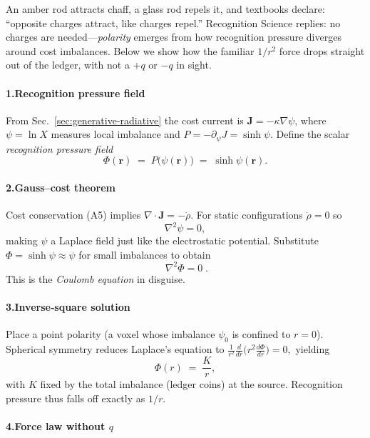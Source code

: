 \documentclass[11pt,oneside]{book}
\begin{document}
An amber rod attracts chaff, a glass rod repels it, and textbooks
declare: “opposite charges attract, like charges repel.”  
Recognition Science replies: no charges are needed—\emph{polarity}
emerges from how recognition pressure diverges around cost imbalances.
Below we show how the familiar \(1/r^{2}\) force drops straight out of
the ledger, with not a \(+q\) or \(-q\) in sight.

\paragraph*{1.\;Recognition pressure field}

From Sec.~\ref{sec:generative-radiative} the cost current is
\(\mathbf J=-\kappa\nabla\psi\), where
\(\psi=\ln X\) measures local imbalance and
\(P=-\partial_\psi J=\sinh\psi\).  
Define the scalar \emph{recognition pressure field}
\[
  \Phi(\mathbf r)
  \;=\;
  P\bigl(\psi(\mathbf r)\bigr)
  \;=\;
  \sinh\psi(\mathbf r).
\]

\paragraph*{2.\;Gauss–cost theorem}

Cost conservation (A5) implies
\(
  \nabla\!\cdot\!\mathbf J = -\dot\rho.
\)
For static configurations \(\dot\rho=0\) so
\[
  \nabla^{2}\psi = 0,
\]
making \(\psi\) a Laplace field just like the electrostatic potential.
Substitute \(\Phi=\sinh\psi\approx\psi\) for small imbalances to obtain
\[
  \boxed{\;\nabla^{2}\Phi = 0\;}.
\]
This is the \emph{Coulomb equation} in disguise.

\paragraph*{3.\;Inverse‐square solution}

Place a point polarity (a voxel whose imbalance \(\psi_{0}\) is confined
to \(r=0\)).  
Spherical symmetry reduces Laplace’s equation to
\(
  \frac{1}{r^{2}}\frac{d}{dr}\bigl(r^{2}\frac{d\Phi}{dr}\bigr)=0,
\)
yielding
\[
  \Phi(r)
  \;=\;
  \frac{K}{r},
\]
with \(K\) fixed by the total imbalance (ledger coins) at the source.
Recognition pressure thus falls off exactly as \(1/r\).

\paragraph*{4.\;Force law without \(q\)}
\end{document}
